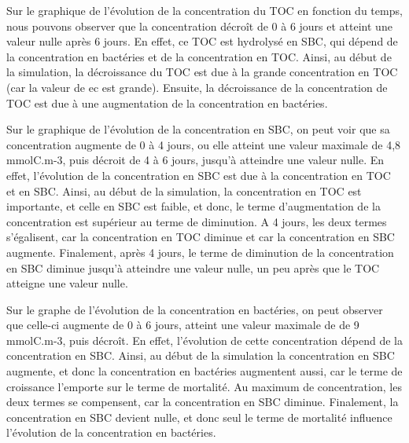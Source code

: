 \par{
Sur le graphique de l'\'evolution de la concentration du TOC en fonction du temps, nous pouvons observer que la concentration d\'ecro\^it de 0 \`a 6 jours et atteint une valeur nulle apr\`es 6 jours. En effet, ce TOC est hydrolys\'e en SBC, qui d\'epend de la concentration en bact\'eries et de la concentration en TOC. Ainsi, au d\'ebut de la simulation, la d\'ecroissance du TOC est due \`a la grande concentration en TOC (car la valeur de ec est grande). Ensuite, la d\'ecroissance de la concentration de TOC est due \`a une augmentation de la concentration en bact\'eries.
}
\par{
Sur le graphique de l'\'evolution de la concentration en SBC, on peut voir que sa concentration augmente de 0 \`a 4 jours, ou elle atteint une valeur maximale de 4,8 mmolC.m-3, puis d\'ecroit de 4 \`a 6 jours, jusqu'\`a atteindre une valeur nulle. En effet, l'\'evolution de la concentration en SBC est due \`a la concentration en TOC et en SBC. Ainsi, au d\'ebut de la simulation, la concentration en TOC est importante, et celle en SBC est faible, et donc, le terme d'augmentation de la concentration est sup\'erieur au terme de diminution. A 4 jours, les deux termes s'\'egalisent, car la concentration en TOC diminue et car la concentration en SBC augmente. Finalement, apr\`es 4 jours, le terme de diminution de la concentration en SBC diminue jusqu'\`a atteindre une valeur nulle, un peu apr\`es que le TOC atteigne une valeur nulle.
}
\par{
Sur le graphe de l'\'evolution de la concentration en bact\'eries, on peut observer que celle-ci augmente de 0 \`a 6 jours, atteint une valeur maximale de de 9 mmolC.m-3, puis d\'ecro\^it. En effet, l'\'evolution de cette concentration d\'epend de la concentration en SBC. Ainsi, au d\'ebut de la simulation la concentration en SBC augmente, et donc la concentration en bact\'eries augmentent aussi, car le terme de croissance l'emporte sur le terme de mortalit\'e. Au maximum de concentration, les deux termes se compensent, car la concentration en SBC diminue. Finalement, la concentration en SBC devient nulle, et donc seul le terme de mortalit\'e influence l'\'evolution de la concentration en bact\'eries.
}
